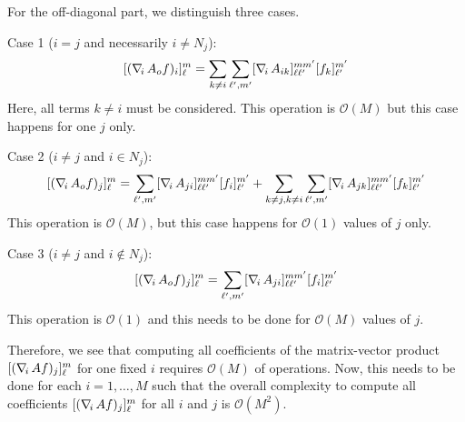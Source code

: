 For the off-diagonal part, we distinguish three cases.

Case 1 ($i=j$ and necessarily $i\neq N_j$):
\[
	[(\nabla_{\!i}\, A_o f)_i]_\ell^m 
	= 	\sum_{k\neq i} \sum_{\ell',m'} [\nabla_{\!i}\, A_{ik}]_{\ell \ell'}^{m m'} [f_k]_{\ell'}^{m'} 
\]
Here, all terms $k\neq i$ must be considered. This operation is $\mathcal O(M)$ but this case happens for one $j$ only.

Case 2 ($i\neq j$ and $i\in N_j$):
\[
	[(\nabla_{\!i}\, A_o f)_j]_\ell^m 
	= \sum_{\ell',m'} [\nabla_{\!i}\, A_{ji}]_{\ell \ell'}^{m m'} [f_i]_{\ell'}^{m'} 
	+ \sum_{k\neq j, k\neq i} \sum_{\ell',m'} [\nabla_{\!i}\, A_{jk}]_{\ell \ell'}^{m m'} [f_k]_{\ell'}^{m'} 
\]
This operation is $\mathcal O(M)$, but this case happens for $\mathcal O(1)$ values of $j$ only.

Case 3 ($i\neq j$ and $i\not \in N_j$):
\[
	[(\nabla_{\!i}\, A_o f)_j]_\ell^m 
	= \sum_{\ell',m'} [\nabla_{\!i}\, A_{ji}]_{\ell \ell'}^{m m'} [f_i]_{\ell'}^{m'} 
\]
This operation is $\mathcal O(1)$ and this needs to be done for $\mathcal O(M)$ values of $j$.

Therefore, we see that computing all coefficients of the matrix-vector product $[(\nabla_{\!i}\, A f)_j]_\ell^m $ for one fixed $i$ requires $\mathcal O(M)$ of operations. 
Now, this needs to be done for each $i=1,\ldots,M$ such that the overall complexity to compute all coefficients $[(\nabla_{\!i}\, A f)_j]_\ell^m $ for all $i$ and $j$ is $\mathcal O(M^2)$.



%
%
